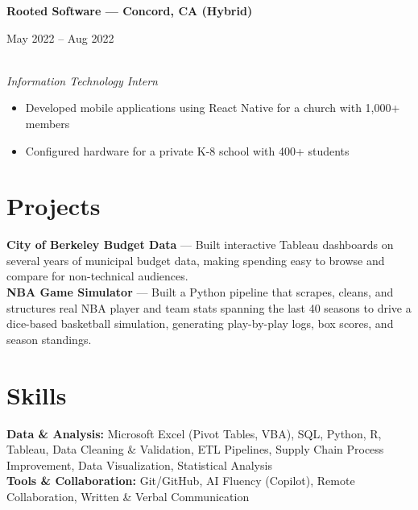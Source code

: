 \documentclass[11pt,letterpaper]{article}
\newcommand{\entry}[3]{%
  \noindent\begin{minipage}[t]{0.72\textwidth}\raggedright\textbf{#1}\end{minipage}%
  \hfill\begin{minipage}[t]{0.26\textwidth}\raggedleft\small\color{gray}#2\end{minipage}\\
  \textit{#3}\par\vspace{2pt}
}
\begin{document}
\entry{Rooted Software --- Concord, CA (Hybrid)}{May 2022 -- Aug 2022}{Information Technology Intern}
\begin{itemize}
  \item Developed mobile applications using React Native for a church with 1,000+ members
  \item Configured hardware for a private K-8 school with 400+ students
\end{itemize}

\section*{Projects}
\textbf{City of Berkeley Budget Data} --- Built interactive Tableau dashboards on several years of municipal budget data, making spending easy to browse and compare for non-technical audiences.\\[4pt]
\textbf{NBA Game Simulator} --- Built a Python pipeline that scrapes, cleans, and structures real NBA player and team stats spanning the last 40 seasons to drive a dice-based basketball simulation, generating play-by-play logs, box scores, and season standings.

\section*{Skills}
\textbf{Data \& Analysis:} Microsoft Excel (Pivot Tables, VBA), SQL, Python, R, Tableau, Data Cleaning \& Validation, ETL Pipelines, Supply Chain Process Improvement, Data Visualization, Statistical Analysis\\
\textbf{Tools \& Collaboration:} Git/GitHub, AI Fluency (Copilot), Remote Collaboration, Written \& Verbal Communication
\end{document}
